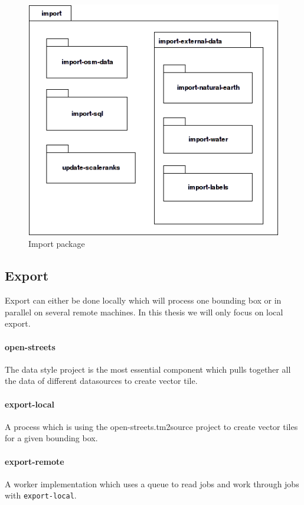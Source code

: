 \begin{figure}[h]
  \includegraphics[scale=0.6]{images/import_all_package_diagram.png}
  \caption{Import package}
\end{figure}


\newpage
\subsection{Export}
Export can either be done locally which will process one bounding box or in parallel on several
remote machines. In this thesis we will only focus on local export.


\paragraph{open-streets}
The data style project is the most essential component which pulls together all the
data of different datasources to create vector tile. 

\paragraph{export-local}
A process which is using the open-streets.tm2source project to create vector tiles for a
given bounding box.

\paragraph{export-remote}
A worker implementation which uses a queue to read jobs and work through jobs with
\texttt{export-local}.

